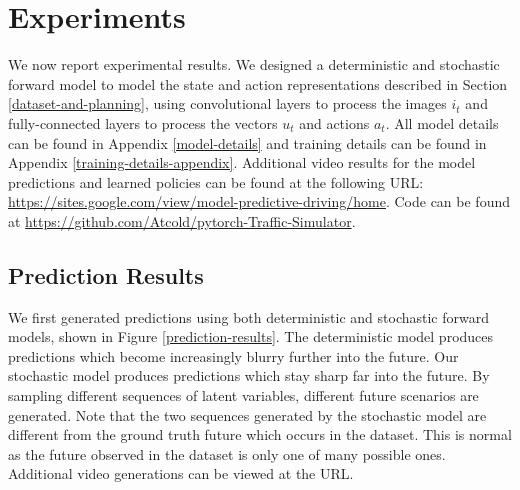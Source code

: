 \documentclass{article} %
\begin{document}
\section{Experiments}
\label{experiments}

We now report experimental results. We designed a deterministic and stochastic forward model to model the state and action representations described in Section \ref{dataset-and-planning}, using convolutional layers to process the images $i_t$ and fully-connected layers to process the vectors $u_t$ and actions $a_t$. All model details can be found in Appendix \ref{model-details} and training details can be found in Appendix \ref{training-details-appendix}.
Additional video results for the model predictions and learned policies can be found at the following URL: \url{https://sites.google.com/view/model-predictive-driving/home}.
Code can be found at \url{https://github.com/Atcold/pytorch-Traffic-Simulator}.


    \subsection{Prediction Results}


    We first generated predictions using both deterministic and stochastic forward models, shown in  Figure \ref{prediction-results}.
    The deterministic model produces predictions which become increasingly blurry further into the future. Our stochastic model produces predictions which stay sharp far into the future.
    By sampling different sequences of latent variables, different future scenarios are generated.
    Note that the two sequences generated by the stochastic model are different from the ground truth future which occurs in the dataset.
    This is normal as the future observed in the dataset is only one of many possible ones.
    Additional video generations can be viewed at the URL.
\end{document}
